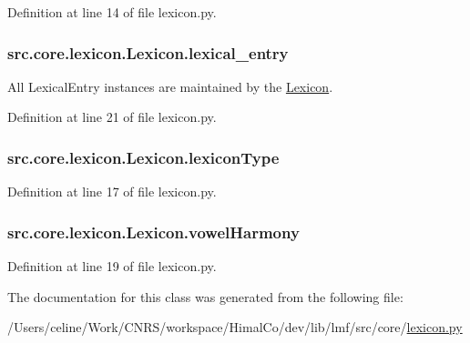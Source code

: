 Definition at line 14 of file lexicon.\+py.

\hypertarget{classsrc_1_1core_1_1lexicon_1_1_lexicon_a634b78912763e32484be1adb095bbe21}{
\subsubsection[{lexical\+\_\+entry}]{\setlength{\rightskip}{0pt plus 5cm}src.\+core.\+lexicon.\+Lexicon.\+lexical\+\_\+entry}}\label{classsrc_1_1core_1_1lexicon_1_1_lexicon_a634b78912763e32484be1adb095bbe21}


All Lexical\+Entry instances are maintained by the \hyperlink{classsrc_1_1core_1_1lexicon_1_1_lexicon}{Lexicon}. 



Definition at line 21 of file lexicon.\+py.

\hypertarget{classsrc_1_1core_1_1lexicon_1_1_lexicon_a1e0df327bd01235e6e38a214584cef5d}{
\subsubsection[{lexicon\+Type}]{\setlength{\rightskip}{0pt plus 5cm}src.\+core.\+lexicon.\+Lexicon.\+lexicon\+Type}}\label{classsrc_1_1core_1_1lexicon_1_1_lexicon_a1e0df327bd01235e6e38a214584cef5d}


Definition at line 17 of file lexicon.\+py.

\hypertarget{classsrc_1_1core_1_1lexicon_1_1_lexicon_a90017a2b027d2510fcdd6ff2be0ea7af}{
\subsubsection[{vowel\+Harmony}]{\setlength{\rightskip}{0pt plus 5cm}src.\+core.\+lexicon.\+Lexicon.\+vowel\+Harmony}}\label{classsrc_1_1core_1_1lexicon_1_1_lexicon_a90017a2b027d2510fcdd6ff2be0ea7af}


Definition at line 19 of file lexicon.\+py.



The documentation for this class was generated from the following file\+:\begin{DoxyCompactItemize}
\item 
/\+Users/celine/\+Work/\+C\+N\+R\+S/workspace/\+Himal\+Co/dev/lib/lmf/src/core/\hyperlink{lexicon_8py}{lexicon.\+py}\end{DoxyCompactItemize}
